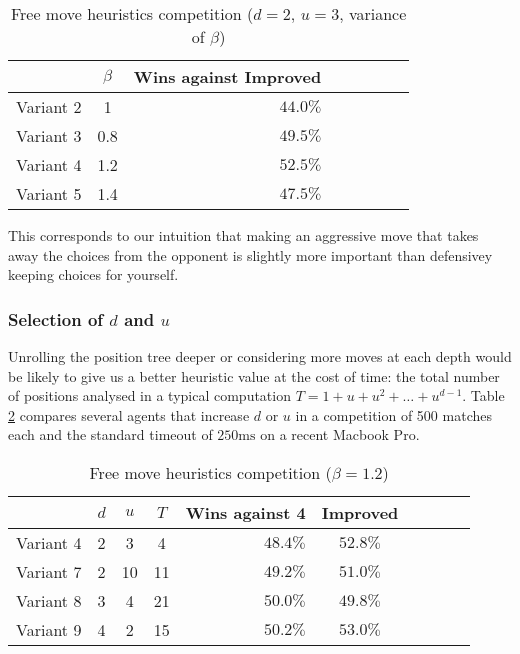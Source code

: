 \documentclass[oneside]{article}   	%
\begin{document}
\begin{table}[htp]
\caption{Free move heuristics competition ($d=2$, $u=3$, variance of $\beta$)}
\begin{center}
\begin{tabular}{c|c|rcccc|c}
    & $\beta$ & Wins against Improved \\
   \hline
 Variant 2  & 1 & $44.0\%$ \\
 Variant 3  & 0.8 & $49.5\%$ \\
 Variant 4  & 1.2 & $52.5\%$ \\
 Variant 5  & 1.4 & $47.5\%$ \\ 
\end{tabular}
\end{center}
\label{FreeMoveBetaCompetition}
\end{table}%

This corresponds to our intuition that making an aggressive move that takes away
the choices from the opponent is slightly more important than defensivey keeping choices for yourself.

\subsubsection{Selection of $d$ and $u$}
\label{FreeMoveDUCompetitions}

Unrolling the position tree deeper or considering more moves at each depth would be likely to give us a better heuristic value at the cost of time: the total number of positions analysed in a typical computation $T = 1+u+u^2+\dots+u^{d-1}$. Table \ref{FreeMoveDUCompetition} compares several agents that increase $d$ or $u$ in a competition of 500 matches each and the standard timeout of $250\textrm{ms}$ on a recent Macbook Pro.

\begin{table}[htp]
\caption{Free move heuristics competition ($\beta = 1.2$)}
\begin{center}
\begin{tabular}{c|cc|c|rccccc}
   & $d$ & $u$ & $T$  & Wins against 4 & Improved \\
   \hline
 Variant 4 &    2 & 3   & 4   & $48.4\%$ & $52.8\%$ \\
 Variant 7 &    2 & 10  & 11  & $49.2\%$ & $51.0\%$ \\
 Variant 8 &    3 & 4   & 21  & $50.0\%$ & $49.8\%$ \\
 Variant 9 &    4 & 2   & 15  & $50.2\%$ & $53.0\%$ \\
\end{tabular}
\end{center}
\label{FreeMoveDUCompetition}
\end{table}%
\end{document}
